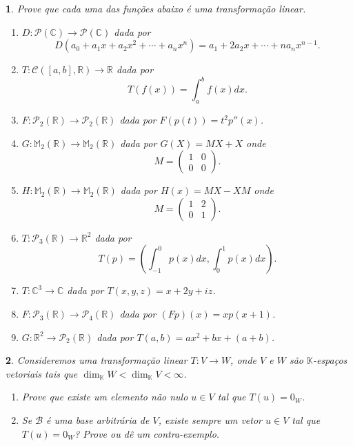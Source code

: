 \documentclass[12pt]{exam}
\newtheorem{exercicio}{}
\newcommand{\real}{\mathbb{R}}
\newcommand{\complex}{\mathbb{C}}
\newcommand{\cp}[1]{\mathbb{#1}}
\begin{document}
\begin{exercicio}
  Prove que cada uma das fun\c{c}\~oes abaixo \'e uma transforma\c{c}\~ao linear.
  \begin{enumerate}[label=({\alph*})]
     \item $D : \mathcal{P}(\complex) \to \mathcal{P}(\complex)$ dada por
    \[
      D(a_0 + a_1x + a_2x^2 + \cdots + a_nx^n) = a_1 + 2a_2x + \cdots + na_nx^{n - 1}.
    \]
    \item $T : \mathcal{C}([a,b], \real) \to \real$ dada por
    \[
      T(f(x)) = \int_a^bf(x)dx.
    \]
    \item $F : \mathcal{P}_2(\real) \to \mathcal{P}_2(\real)$ dada por $F(p(t)) = t^2p''(x)$.
    \item $G : \cp{M}_2(\real) \to \cp{M}_2(\real)$ dada por $G(X) = MX + X$ onde
    \[
      M = \begin{pmatrix}
        1 & 0\\
        0 & 0
      \end{pmatrix}.
    \]
    \item $H : \cp{M}_2(\real) \to \cp{M}_2(\real)$ dada por $H(x) = MX - XM$ onde
    \[
      M = \begin{pmatrix}
        1 & 2\\
        0 & 1
      \end{pmatrix}.
    \]
    \item $T : \mathcal{P}_3(\real) \to \real^2$ dada por
    \[
      T(p) = \left(\int_{-1}^0p(x)dx, \int_0^1p(x)dx\right).
    \]
    \item $T : \complex^3 \to \complex$ dada por $T(x,y,z) = x + 2y + iz$.
    \item $F : \mathcal{P}_3(\real) \to \mathcal{P}_4(\real)$ dada por $(Fp)(x) = xp(x + 1)$.
    \item $G : \real^2 \to \mathcal{P}_2(\real)$ dada por $T(a,b) = ax^2 + bx + (a + b)$.
   \end{enumerate}
\end{exercicio}

\begin{exercicio}
  Consideremos uma transforma\c{c}\~ao linear $T : V \to W$, onde $V$ e $W$ s\~ao $\cp{K}$-espa\c{c}os vetoriais tais que $\dim_\cp{K}W < \dim_\cp{K}V < \infty$.
  \begin{enumerate}[label=({\alph*})]
    \item Prove que existe um elemento n\~ao nulo $u \in V$ tal que $T(u) = 0_W$.
    \item Se $\mathcal{B}$ \'e uma base arbitr\'aria de $V$, existe sempre um vetor $u \in V$ tal que $T(u) = 0_W$? Prove ou d\^e um contra-exemplo.
  \end{enumerate}
\end{exercicio}
\end{document}
